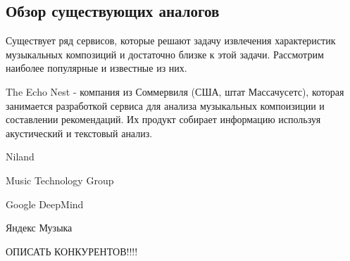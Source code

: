 \subsection{Обзор существующих аналогов}
\label{sec:analysis:analogues}

Существует ряд сервисов, которые решают задачу извлечения характеристик музыкальных композиций и достаточно близке к этой задачи. Рассмотрим наиболее популярные и известные из них.

The Echo Nest - компания из Соммервиля (США, штат Массачусетс), которая занимается разработкой сервиса для анализа музыкальных компоизиции и составлении рекомендаций. Их продукт собирает информацию используя акустический и текстовый анализ.

Niland

Music Technology Group

Google DeepMind

Яндекс Музыка

ОПИСАТЬ КОНКУРЕНТОВ!!!!
